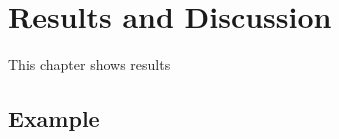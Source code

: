 \chapter{Results and Discussion}
\label{cap:Results and Discussion}



This chapter shows results 

\section{Example}
